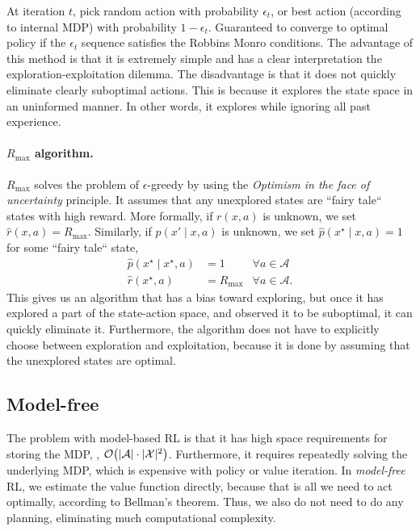 At iteration $t$, pick random action with probability $\epsilon_t$, or best
action (according to internal MDP) with probability $1-\epsilon_t$. Guaranteed
to converge to optimal policy if the $\epsilon_t$ sequence satisfies the
Robbins Monro conditions. The advantage of this method is that it is extremely
simple and has a clear interpretation \wrt the exploration-exploitation
dilemma. The disadvantage is that it does not quickly eliminate clearly
suboptimal actions. This is because it explores the state space in an
uninformed manner. In other words, it explores while ignoring all past
experience.

\paragraph{$R_{\max}$ algorithm.}

$R_{\max}$ solves the problem of $\epsilon$-greedy by using the
\textit{Optimism in the face of uncertainty} principle. It assumes that any
unexplored states are ``fairy tale`` states with high reward. More formally, if
$r(x,a)$ is unknown, we set $\hat{r}(x,a)=R_{\max}$. Similarly, if $p(x'\mid
x,a)$ is unknown, we set $\hat{p}(x^\star\mid x,a)=1$ for some ``fairy tale`` state,
\begin{align*}
  \hat{p}(x^\star\mid x^\star, a) &= 1 & \forall a \in \mathcal{A} \\
  \hat{r}(x^\star, a) &= R_{\max} & \forall a \in \mathcal{A}.
\end{align*}
This gives us an algorithm that has a bias toward exploring, but once it has
explored a part of the state-action space, and observed it to be suboptimal, it
can quickly eliminate it. Furthermore, the algorithm does not have to
explicitly choose between exploration and exploitation, because it is done by
assuming that the unexplored states are optimal.

\subsection{Model-free}

The problem with model-based RL is that it has high space requirements for
storing the MDP, \ie, $\bigo{|\mathcal{A}|\cdot |\mathcal{X}|^2}$. Furthermore,
it requires repeatedly solving the underlying MDP, which is expensive with
policy or value iteration. In \textit{model-free} RL, we estimate the value
function directly, because that is all we need to act optimally, according to
Bellman's theorem. Thus, we also do not need to do any planning, eliminating
much computational complexity.

